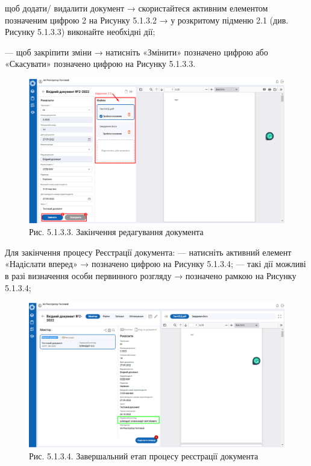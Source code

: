 щоб додати/ видалити документ → скористайтеся активним елементом
позначеним цифрою 2 на Рисунку 5.1.3.2 → у розкритому підменю 2.1 (див.
Рисунку 5.1.3.3) виконайте необхідні дії;

--- щоб закріпити зміни → натисніть «Змінити» позначено цифрою  або
«Скасувати» позначено цифрою  на Рисунку 5.1.3.3.

\begin{figure}[!htbp]
\centerline{\includegraphics[width=\textwidth]{img/5.1.3.3.png}}
\caption{Рис. 5.1.3.3. Закінчення редагування документа}
\end{figure}

Для закінчення процесу Реєстрації документа:
--- натисніть активний елемент «Надіслати вперед» → позначено цифрою  на Рисунку 5.1.3.4;
--- такі дії можливі в разі визначення особи первинного розгляду → позначено рамкою на Рисунку 5.1.3.4;

\begin{figure}[!htbp]
\centerline{\includegraphics[width=\textwidth]{img/5.1.3.4.png}}
\caption{Рис. 5.1.3.4. Завершальний етап процесу реєстрації документа}
\end{figure}

